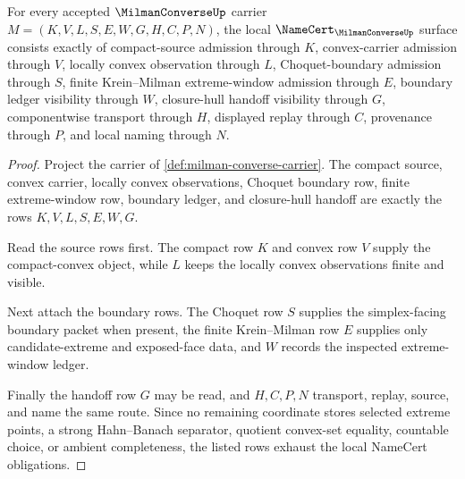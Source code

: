 \begin{theorem}
\label{thm:milman-converse-namecert-obligations}
For every accepted $\MilmanConverseUp$ carrier $M=(K,V,L,S,E,W,G,H,C,P,N)$, the local $\NameCert_{\MilmanConverseUp}$ surface consists exactly of compact-source admission through $K$, convex-carrier admission through $V$, locally convex observation through $L$, Choquet-boundary admission through $S$, finite Krein--Milman extreme-window admission through $E$, boundary ledger visibility through $W$, closure-hull handoff visibility through $G$, componentwise transport through $H$, displayed replay through $C$, provenance through $P$, and local naming through $N$.
\end{theorem}
\begin{proof}
Project the carrier of \autoref{def:milman-converse-carrier}. The compact source, convex carrier, locally convex observations, Choquet boundary row, finite extreme-window row, boundary ledger, and closure-hull handoff are exactly the rows $K,V,L,S,E,W,G$.

Read the source rows first. The compact row $K$ and convex row $V$ supply the compact-convex object, while $L$ keeps the locally convex observations finite and visible.

Next attach the boundary rows. The Choquet row $S$ supplies the simplex-facing boundary packet when present, the finite Krein--Milman row $E$ supplies only candidate-extreme and exposed-face data, and $W$ records the inspected extreme-window ledger.

Finally the handoff row $G$ may be read, and $H,C,P,N$ transport, replay, source, and name the same route. Since no remaining coordinate stores selected extreme points, a strong Hahn--Banach separator, quotient convex-set equality, countable choice, or ambient completeness, the listed rows exhaust the local NameCert obligations.
\end{proof}

